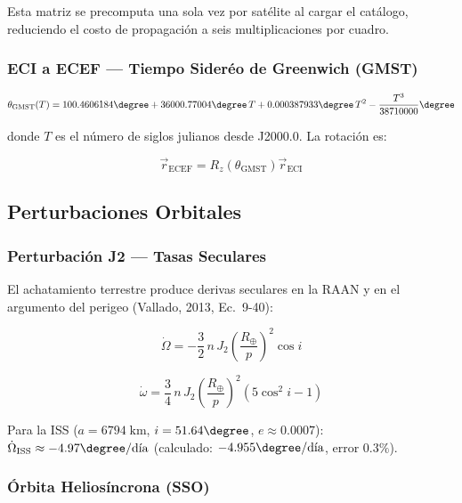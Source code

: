 \documentclass[12pt,a4paper]{article}
\newcommand{\RE}{R_{\oplus}}
\begin{document}
Esta matriz se precomputa una sola vez por sat\'elite al cargar el cat\'alogo, reduciendo el costo de propagaci\'on a seis multiplicaciones por cuadro.

\subsubsection{ECI a ECEF --- Tiempo Sider\'eo de Greenwich (GMST)}

\begin{equation}
  \theta_{\text{GMST}}(T) = 100.4606184\degree + 36000.77004\degree\,T
    + 0.000387933\degree\,T^2 - \frac{T^3}{38710000}\degree
\end{equation}

donde $T$ es el n\'umero de siglos julianos desde J2000.0. La rotaci\'on es:

\begin{equation}
  \vec{r}_{\text{ECEF}} = R_z\!\left(\theta_{\text{GMST}}\right)\vec{r}_{\text{ECI}}
\end{equation}

\subsection{Perturbaciones Orbitales}

\subsubsection{Perturbaci\'on J2 --- Tasas Seculares}

El achatamiento terrestre produce derivas seculares en la RAAN y en el argumento del perigeo (Vallado, 2013, Ec.~9-40):

\begin{equation}
  \dot{\Omega} = -\frac{3}{2}\,n\,J_2\!\left(\frac{\RE}{p}\right)^{\!2}\cos i
  \label{eq:raan_drift}
\end{equation}

\begin{equation}
  \dot{\omega} = \frac{3}{4}\,n\,J_2\!\left(\frac{\RE}{p}\right)^{\!2}(5\cos^2 i - 1)
\end{equation}

Para la ISS ($a = 6794\;\text{km}$, $i = 51.64\degree$, $e \approx 0.0007$):
$\dot{\Omega}_{\text{ISS}} \approx -4.97\degree/\text{d\'ia}$ (calculado: $-4.955\degree/\text{d\'ia}$, error $0.3\%$).

\subsubsection{\'Orbita Helios\'incrona (SSO)}
\end{document}
